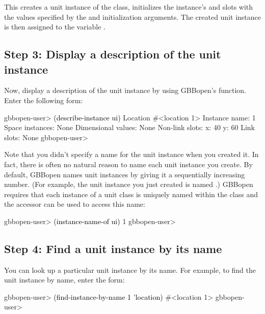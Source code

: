 \documentclass[10pt,twoside,english,pdftex]{article}
\begin{document}
This creates a unit instance of the  class, initializes
the instance's  and  slots with the values specified by the
 and  initialization arguments.  The created unit instance
is then assigned to the variable .

\subsection*{Step 3: Display a description of the unit instance}

%
%
%
Now, display a description of the unit instance by using GBBopen's
 function.  Enter the following form:
%
\W\supp
\begin{example}
\textcolor{darkergray}{%
  gbbopen-user> \textcolor{black}{(describe-instance ui)}
  Location #<location 1>
    Instance name: 1
    Space instances: None
    Dimensional values: None
    Non-link slots:
      x:  40
      y:  60
    Link slots: None
  gbbopen-user>}
\end{example}

%
Note that you didn't specify a name for the unit instance when you created it.
In fact, there is often no natural reason to name each unit instance you
create. By default, GBBopen names unit instances by giving it a sequentially
increasing number.  (For example, the unit instance you just created is named
.)  GBBopen requires that each instance of a unit class is uniquely
named within the class and the accessor  can
be used to access this name:
%
\W\supp
\begin{example}
\textcolor{darkergray}{%
  gbbopen-user> \textcolor{black}{(instance-name-of ui)}
  1
  gbbopen-user>}
\end{example}

\subsection*{Step 4: Find a unit instance by its name}

%
%
%
You can look up a particular unit instance by its name. For example, to find
the   unit instance by name, enter the form:
%
\W\supp
\begin{example}
\textcolor{darkergray}{%
  gbbopen-user> \textcolor{black}{(find-instance-by-name 1 'location)}
  #<location 1>
  gbbopen-user>}
\end{example}
\end{document}
